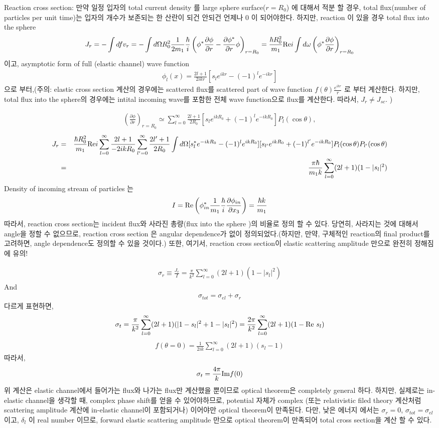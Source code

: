 \documentclass[10pt]{article}
\newcommand{\bea}{\begin{eqnarray}}
\newcommand{\eea}{\end{eqnarray}}
\newcommand{\no}{\nonumber \\}
\newcommand{\del}{\partial}
\begin{document}
Reaction cross section: 만약 일정 입자의 
total current density 를 large sphere
surface($r=R_0$) 에 대해서 적분 할 경우, 
total flux(number of particles per unit time)는 
입자의 개수가 보존되는 한 산란이 되건 안되건 
언제나 0 이 되어야한다. 하지만, reaction 이 있을 경우 
total flux into the sphere 
\bea
J_r=-\int df v_r
   =-\int d\Omega R_0^2 \frac{1}{2m_1}\frac{\hbar}{i}
    \left(\phi^*\frac{\del \phi}{\del r}
    -\frac{\del \phi^*}{\del r}\phi \right)_{r=R_0}
   =\frac{\hbar R_0^2}{m_1}{\rm Re} i\int d\omega
   \left(\phi^*\frac{\del\phi}{\del r}\right)_{r=R_0} 
\eea
이고, asymptotic form of full (elastic channel) wave function
\bea
\phi_l(x)=\frac{2l+1}{2ikr}[s_l e^{ikr}-(-1)^l e^{-ikr}] 
\eea
으로 부터,(주의: elastic cross section 계산의 경우에는 
scattered flux를 scattered part of wave function $f(\theta)\frac{e^{ikr}}{r}$
로 부터 계산한다. 하지만, total flux into the sphere의 경우에는 
intital incoming wave를 포함한 전체 wave function으로 
flux를 계산한다. 따라서, $J_r\neq J_{sc}$.
)

\bea
\left(\frac{\del\phi}{\del r}\right)_{r=R_0}
\simeq \sum_{l=0}^\infty \frac{2l+1}{2R_0}
 [s_le^{ikR_0}+(-1)^l e^{-ikR_0}]P_l(\cos\theta),
\eea
\bea
J_r&=&\frac{\hbar R_0^2}{m_1}{\rm Re} i
  \sum_{l=0}^\infty \frac{2l+1}{-2ik R_0}
  \sum_{l'=0}^\infty \frac{2l'+1}{2R_0}
  \int d\Omega
  [s_l^* e^{-ikR_0}-(-1)^l e^{ikR_0}]
  [s_{l'}e^{ikR_0}+(-1)^{l'}e^{-ikR_0}]
  P_l(\cos\theta) P_{l'}(\cos\theta)
  \no &=&\frac{\pi\hbar}{m_1 k}\sum_{l=0}^\infty(2l+1)(1-|s_l|^2) 
\eea
Density of incoming stream of particles 는
\bea
I={\rm Re}\left( \phi_{in}^* \frac{1}{m_1}\frac{\hbar}{i}
  \frac{\del \phi_{in}}{\del x_3}\right)=\frac{\hbar k}{m_1}
\eea
따라서, reaction cross section는 incident flux와
사라진 총량(flux into the sphere )의
비율로 정의 할 수 있다. 당연히, 사라지는 것에 대해서 angle을
정할 수 없으므로, reaction cross section 은 
angular dependence가 없이 정의되었다.(하지만,
만약, 구체적인 reaction의 final product를 고려하면,
angle dependence도 정의할 수 있을 것이다.) 또한,
여기서, reaction cross section이 elastic scattering amplitude
만으로 완전히 정해짐에 유의!

\bea
\sigma_r\equiv\frac{J_r}{I}
 =\frac{\pi}{k^2}\sum_{l=0}^\infty (2l+1)(1-|s_l|^2)
\eea
And
\bea
\sigma_{tot}=\sigma_{el}+\sigma_r
\eea
다르게 표현하면,
\bea
\sigma_t=\frac{\pi}{k^2}\sum_{l=0}^\infty(2l+1)
   (|1-s_l|^2+1-|s_l|^2)
   =\frac{2\pi}{k^2}\sum_{l=0}^\infty (2l+1)(1-{\rm Re}\ s_l)
\eea
\bea
f(\theta=0)=\frac{1}{2ik}\sum_{l=0}^\infty (2l+1)(s_l-1)
\eea
따라서,
\bea
\sigma_t=\frac{4\pi}{k}{\rm Im} f(0)
\eea
위 계산은 
elastic channel에서 들어가는 flux와 나가는 flux만 계산했을 뿐이므로
optical theorem은 completely general 하다.
하지만, 실제로는 in-elastic channel을 생각할 때, complex phase shift를 
얻을 수 있어야하므로, potential 자체가 complex
(또는 relativistic filed theory 계산처럼 
scattering amplitude 계산에 in-elastic channel이 포함되거나) 이어야만 
optical theorem이 만족된다.  다만, 
낮은 에너지 에서는 $\sigma_r=0$, 
$\sigma_{tot}=\sigma_{el}$ 이고, $\delta_l$ 이 real number 이므로,
forward elastic scattering amplitude 만으로 optical theorem이 만족되어
total cross section을 계산 할 수 있다. 
\end{document}
